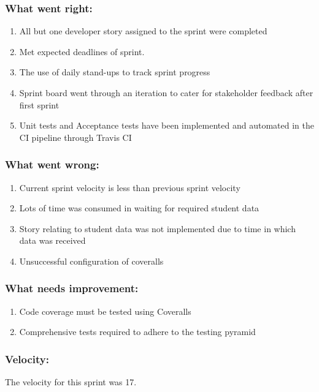 \documentclass[10pt,onecolumn]{witseiepaper}
\begin{document}
\subsubsection*{What went right:}
\begin{enumerate}
	\item All but one developer story assigned to the sprint were completed
	\item Met expected deadlines of sprint.
	\item The use of daily stand-ups to track sprint progress
	\item Sprint board went through an iteration to cater for stakeholder feedback after first sprint
	\item Unit tests and Acceptance tests have been implemented and automated in the CI pipeline through Travis CI
\end{enumerate}

\subsubsection*{What went wrong:}
\begin{enumerate}
	\item Current sprint velocity is less than previous sprint velocity
	\item Lots of time was consumed in waiting for required student data
	\item Story relating to student data was not implemented due to time in which data was received
	\item Unsuccessful configuration of coveralls
\end{enumerate}

\subsubsection*{What needs improvement:}
\begin{enumerate}
	\item Code coverage must be tested using Coveralls
	\item Comprehensive tests required to adhere to the testing pyramid
\end{enumerate}

\subsubsection*{Velocity:}
The velocity for this sprint was 17.
\end{document}
